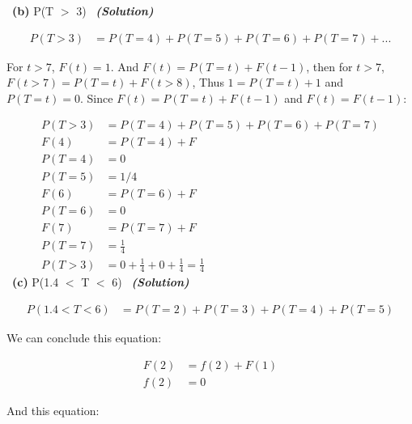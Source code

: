 \documentclass[a4 paper]{article}
\numberwithin{equation}{section}
\newcommand{\subproblem}[1]{~\newline\textbf{(#1)}}
\newcommand{\solution}{~\newline\textbf{\textit{(Solution)}} }
\newcommand{\0}{\mathbf{0}}
\begin{document}
\newline
\subproblem{b} P(T $>$ 3)\newline
\solution

\begin{equation*}
\begin{split}
    P(T>3) & = P(T=4) + P(T=5) + P(T=6) + P(T=7) +  ... 
\end{split}{}
\end{equation*}{}


For $t>7$, $F(t) = 1$. And $F(t) = P(T=t) + F(t-1)$, then for $t>7$, $F(t>7) = P(T=t) + F(t>8)$, Thus $1 = P(T=t) + 1$ and $P(T=t) = 0$. 
Since $F(t) = P(T=t) + F(t-1)$ and $F(t) = F(t-1)$: 



\begin{equation*}
\begin{split}
P (T > 3) &= P (T = 4) + P (T = 5) + P (T = 6) + P (T = 7)\\
F (4) &= P (T = 4) + F \\
P (T = 4) &= 0\\
P (T = 5) &= 1/4 \\
F (6) &= P (T = 6) + F \\
P (T = 6) &= 0 \\
F (7) &= P (T = 7) + F \\
P (T = 7) &= \frac{1}{4} \\
P (T > 3) &= 0 + \frac{1}{4} + 0 + \frac{1}{4} = \frac{1}{4}
\end{split}{}
\end{equation*}{}
\newline
\subproblem{c} P(1.4 $<$ T $<$ 6)\newline
\solution

\begin{equation*}
    \begin{split}
        P (1.4 < T < 6)& = P (T = 2) + P (T = 3) + P (T = 4) + P (T = 5)
    \end{split}{}
\end{equation*}{}

We can conclude this equation:

\begin{equation*}
\begin{split}
    F (2)& = f (2) + F (1)\\
    f(2) &= 0
    \end{split}{}
\end{equation*}{}

And this equation:
\end{document}
